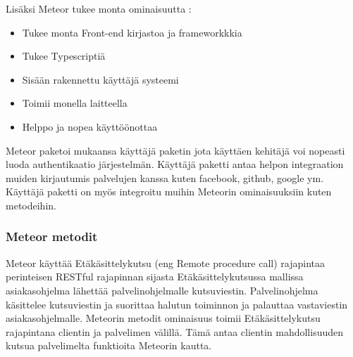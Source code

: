     

Lisäksi Meteor tukee monta ominaisuutta :
\begin{itemize}
    \item Tukee monta Front-end kirjastoa ja frameworkkkia
    \item Tukee Typescriptiä
    \item Sisään rakennettu käyttäjä systeemi
    \item Toimii monella laitteella
    \item Helppo ja nopea käyttöönottaa 
\end{itemize}
\medskip


Meteor paketoi mukaansa käyttäjä paketin jota käyttäen kehitäjä voi nopeasti luoda authentikaatio järjestelmän.
Käyttäjä paketti antaa helpon integraation muiden kirjautumis palvelujen kanssa kuten facebook, github, google ym.
Käyttäjä paketti on myös integroitu muihin Meteorin ominaisuuksiin kuten metodeihin. 



\subsubsection{Meteor metodit}






Meteor käyttää Etäkäsittelykutsu (eng Remote procedure call) rajapintaa perinteisen RESTful rajapinnan sijasta 
Etäkäsittelykutsussa mallissa asiakasohjelma lähettää palvelinohjelmalle kutsuviestin.
Palvelinohjelma käsittelee kutsuviestin ja suorittaa halutun toiminnon ja palauttaa vastaviestin asiakasohjelmalle.
Meteorin metodit ominaisuus toimii Etäkäsittelykutsu rajapintana clientin ja palvelimen välillä. 
Tämä antaa clientin mahdollisuuden kutsua palvelimelta funktioita Meteorin kautta.
\medskip



